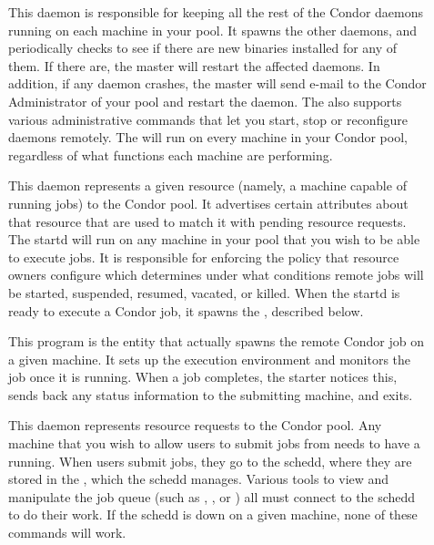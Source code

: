 \begin{description} 

\item[] This daemon
is responsible for keeping all the
rest of the Condor daemons running on each machine in your pool.  It
spawns the other daemons, and periodically checks to see if there are
new binaries installed for any of them.  If there are, the master will
restart the affected daemons.  In addition, if any daemon crashes, the
master will send e-mail to the Condor Administrator of your pool and
restart the daemon.  The  also supports various
administrative commands that let you start, stop or reconfigure
daemons remotely.  The  will run on every machine in
your Condor pool, regardless of what functions each machine are
performing.  

\item[] This daemon
represents a given resource
(namely, a machine capable of running jobs) to the Condor pool.  It
advertises certain attributes about that resource that are used to
match it with pending resource requests.  The startd will run on any
machine in your pool that you wish to be able to execute jobs.  It is
responsible for enforcing the policy that resource owners configure
which determines under what conditions remote jobs will be started,
suspended, resumed, vacated, or killed.  When the startd is ready to
execute a Condor job, it spawns the , described below.

\item[] This program
is the entity that actually
spawns the remote Condor job on a given machine.  It sets up the
execution environment and monitors the job once it is running.  When a
job completes, the starter notices this, sends back any status
information to the submitting machine, and exits.

\item[] This daemon
represents resource requests to
the Condor pool.  Any machine that you wish to allow users to submit
jobs from needs to have a  running.  When users submit
jobs, they go to the schedd, where they are stored in the , which the schedd manages.  Various tools to view and
manipulate the job queue (such as , , or
) all must connect to the schedd to do their work.  If the
schedd is down on a given machine, none of these commands will work.  


\end{description}

